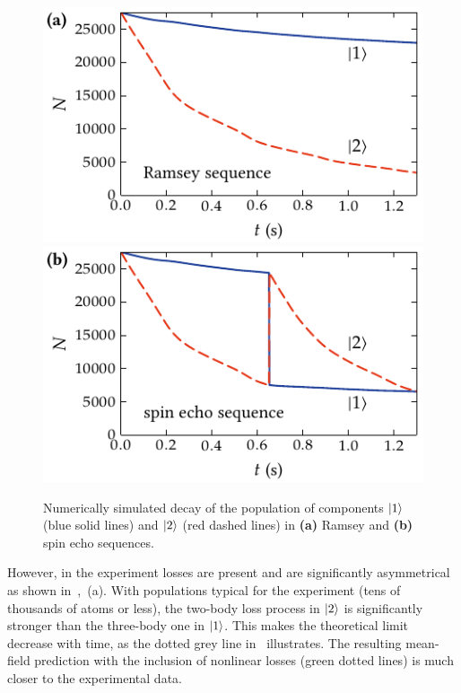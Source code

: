 \begin{figure}
    \centerline{%
    \includegraphics{figures_generated/bec_noise/ramsey_single_run_pop.pdf}%
    \includegraphics{figures_generated/bec_noise/echo_single_run_pop.pdf}}

    \caption[Component population in Ramsey and spin echo sequences]{
    Numerically simulated decay of the population of components $\mbox{\ensuremath{\left\vert 1 \right\rangle}}$ (blue solid lines) and $\mbox{\ensuremath{\left\vert 2 \right\rangle}}$ (red dashed lines) in \textbf{(a)} Ramsey and \textbf{(b)} spin echo sequences.}%

    \label{fig:bec-noise:visibility:population}
\end{figure}

However, in the experiment losses are present and are significantly asymmetrical as shown in~,~(a).
With populations typical for the experiment (tens of thousands of atoms or less), the two-body loss process in $\mbox{\ensuremath{\left\vert 2 \right\rangle}}$ is significantly stronger than the three-body one in $\mbox{\ensuremath{\left\vert 1 \right\rangle}}$.
This makes the theoretical limit~ decrease with time, as the dotted grey line in~ illustrates.
The resulting mean-field prediction with the inclusion of nonlinear losses (green dotted lines) is much closer to the experimental data.

